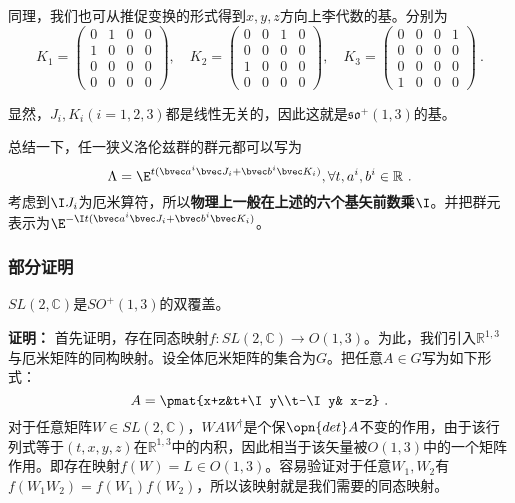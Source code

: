 同理，我们也可从推促变换的形式得到$x,y,z$方向上李代数的基。分别为
\begin{equation}
K_1=\begin{pmatrix}0&1&0&0\\1&0&0&0\\0&0&0&0\\0&0&0&0\end{pmatrix},\quad K_2=\begin{pmatrix}0&0&1&0\\0&0&0&0\\1&0&0&0\\0&0&0&0\end{pmatrix},\quad K_3=\begin{pmatrix}0&0&0&1\\0&0&0&0\\0&0&0&0\\1&0&0&0\end{pmatrix}~.
\end{equation}

显然，$J_i,K_i(i=1,2,3)$都是线性无关的，因此这就是$\mathfrak{so}^+
(1,3)$的基。

总结一下，任一狭义洛伦兹群的群元都可以写为
\begin{equation}\label{eq_qed1_10}
\Lambda =\E^{t(\bvec a^i\bvec J_i+\bvec b^i\bvec K_i)},\forall t,a^i,b^i\in\mathbb R~.
\end{equation}
考虑到$\I J_i$为厄米算符，所以\textbf{物理上一般在上述的六个基矢前数乘$\I$}。并把群元表示为$\E^{-\I t(\bvec a^i\bvec J_i+\bvec b^i\bvec K_i)}$。
\subsubsection{部分证明}
\begin{theorem}{}\label{the_qed1_2}
$SL(2,\mathbb C)$是$SO^+(1,3)$的双覆盖。
\end{theorem}
\textbf{证明：}
首先证明，存在同态映射$f:SL(2,\mathbb C)\to O(1,3)$。为此，我们引入$\mathbb R^{1,3}$与厄米矩阵的同构映射。设全体厄米矩阵的集合为$G$。把任意$A\in G$写为如下形式：
\begin{equation}\label{eq_qed1_5}
A=\pmat{x+z&t+\I y\\t-\I y& x-z}~.
\end{equation}
对于任意矩阵$W\in SL(2,\mathbb C)$，$WAW^{\dagger}$是个保$\opn{det} A$不变的作用，由于该行列式等于$(t,x,y,z)$在$\mathbb R^{1,3}$中的内积，因此相当于该矢量被$O(1,3)$中的一个矩阵作用。即存在映射$f(W)=L\in O(1,3)$。容易验证对于任意$W_1,W_2$有$f(W_1W_2)=f(W_1)f(W_2)$，所以该映射就是我们需要的同态映射。

